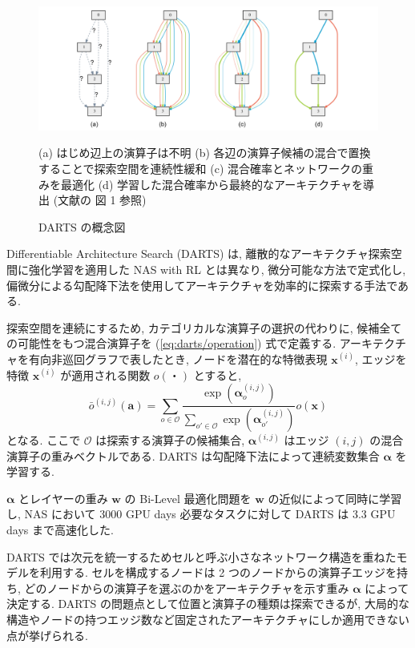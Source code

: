 \begin{figure}[t]
  \begin{center}
    \includegraphics[clip,width=15cm]{./fig/02.tech/darts.png}
  \end{center}
  \caption{DARTS の概念図}
  (a) はじめ辺上の演算子は不明 (b) 各辺の演算子候補の混合で置換することで探索空間を連続性緩和 (c) 混合確率とネットワークの重みを最適化 (d) 学習した混合確率から最終的なアーキテクチャを導出
  (文献\cite{DBLP:journals/corr/abs-1806-09055}の 図 1 参照)
  \label{fig:darts}
\end{figure}

Differentiable Architecture Search (DARTS)\cite{DBLP:journals/corr/abs-1806-09055} は,
離散的なアーキテクチャ探索空間に強化学習を適用した NAS with RL とは異なり,
微分可能な方法で定式化し\cite{Paszke2017AutomaticDI},
偏微分による勾配降下法を使用してアーキテクチャを効率的に探索する手法である.

探索空間を連続にするため, カテゴリカルな演算子の選択の代わりに, 候補全ての可能性をもつ混合演算子を
(\ref{eq:darts/operation}) 式で定義する.
アーキテクチャを有向非巡回グラフで表したとき, ノードを潜在的な特徴表現 $\bm{x}^{(i)}$,
エッジを特徴 $\bm{x}^{(i)}$ が適用される関数 $o(・)$ とすると,
\begin{equation}
  \label{eq:darts/operation}
  \bar{o}^{(i, j)}(\bm{a}) = \sum_{o \in \mathcal{O}} \frac{\exp(\bm{\alpha}^{(i, j)}_o)}{\sum_{o' \in \mathcal{O}} \exp(\bm{\alpha}^{(i, j)}_{o'})} o(\bm{x})
\end{equation}
となる. ここで
$\mathcal{O}$ は探索する演算子の候補集合,
$\bm{\alpha}^{(i, j)}$ はエッジ $(i, j)$ の混合演算子の重みベクトルである.
DARTS は勾配降下法によって連続変数集合 $\bm{\alpha}$ を学習する.

$\bm{\alpha}$ とレイヤーの重み $\bm{w}$ の Bi-Level 最適化問題\cite{Colson2007AnOO}を
$\bm{w}$ の近似によって同時に学習し,
NAS において 3000 GPU days 必要なタスクに対して DARTS は 3.3 GPU days まで高速化した.

DARTS では次元を統一するためセルと呼ぶ小さなネットワーク構造を重ねたモデルを利用する.
セルを構成するノードは 2 つのノードからの演算子エッジを持ち,
どのノードからの演算子を選ぶのかをアーキテクチャを示す重み $\bm{\alpha}$ によって決定する.
DARTS の問題点として位置と演算子の種類は探索できるが,
大局的な構造やノードの持つエッジ数など固定されたアーキテクチャにしか適用できない点が挙げられる.


